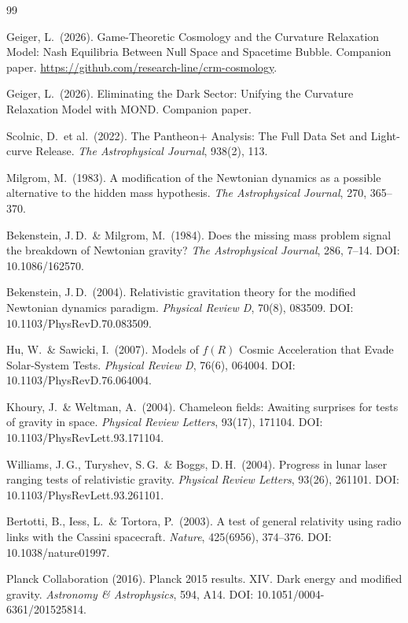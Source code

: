 \documentclass[11pt,a4paper]{article}
\begin{document}
\begin{thebibliography}{99}

Geiger, L.\ (2026).
Game-Theoretic Cosmology and the Curvature Relaxation Model: Nash Equilibria Between Null Space and Spacetime Bubble.
Companion paper. \url{https://github.com/research-line/crm-cosmology}.

Geiger, L.\ (2026).
Eliminating the Dark Sector: Unifying the Curvature Relaxation Model with MOND.
Companion paper.

Scolnic, D.\ et al.\ (2022).
The Pantheon+ Analysis: The Full Data Set and Light-curve Release.
\textit{The Astrophysical Journal}, 938(2), 113.

Milgrom, M.\ (1983).
A modification of the Newtonian dynamics as a possible alternative to the hidden mass hypothesis.
\textit{The Astrophysical Journal}, 270, 365--370.

Bekenstein, J.\,D.\ \& Milgrom, M.\ (1984).
Does the missing mass problem signal the breakdown of Newtonian gravity?
\textit{The Astrophysical Journal}, 286, 7--14.
DOI: 10.1086/162570.

Bekenstein, J.\,D.\ (2004).
Relativistic gravitation theory for the modified Newtonian dynamics paradigm.
\textit{Physical Review D}, 70(8), 083509.
DOI: 10.1103/PhysRevD.70.083509.

Hu, W.\ \& Sawicki, I.\ (2007).
Models of $f(R)$ Cosmic Acceleration that Evade Solar-System Tests.
\textit{Physical Review D}, 76(6), 064004.
DOI: 10.1103/PhysRevD.76.064004.

Khoury, J.\ \& Weltman, A.\ (2004).
Chameleon fields: Awaiting surprises for tests of gravity in space.
\textit{Physical Review Letters}, 93(17), 171104.
DOI: 10.1103/PhysRevLett.93.171104.

Williams, J.\,G., Turyshev, S.\,G.\ \& Boggs, D.\,H.\ (2004).
Progress in lunar laser ranging tests of relativistic gravity.
\textit{Physical Review Letters}, 93(26), 261101.
DOI: 10.1103/PhysRevLett.93.261101.

Bertotti, B., Iess, L.\ \& Tortora, P.\ (2003).
A test of general relativity using radio links with the Cassini spacecraft.
\textit{Nature}, 425(6956), 374--376.
DOI: 10.1038/nature01997.

Planck Collaboration (2016).
Planck 2015 results. XIV. Dark energy and modified gravity.
\textit{Astronomy \& Astrophysics}, 594, A14.
DOI: 10.1051/0004-6361/201525814.


\end{thebibliography}
\end{document}

